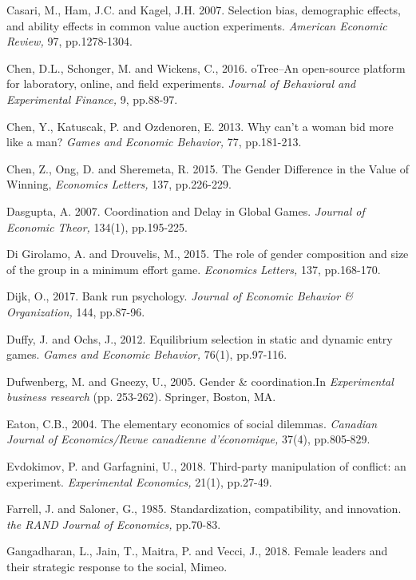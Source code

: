 \documentclass[12pt,english]{article}
\begin{document}
\begin{thebibliography}{10}
\bibitem{} Casari, M., Ham, J.C. and Kagel, J.H. 2007. Selection bias, demographic effects, and ability effects in common value auction experiments. \textit{American Economic Review,} 97, pp.1278-1304.

 Chen, D.L., Schonger, M. and Wickens, C., 2016. oTree--An open-source platform for laboratory, online, and field experiments. \textit{Journal of Behavioral and Experimental Finance,} 9, pp.88-97.

 Chen, Y., Katuscak, P. and Ozdenoren, E. 2013. Why can't a woman bid more like a man? \textit{Games and Economic Behavior,} 77, pp.181-213.

 Chen, Z., Ong, D. and Sheremeta, R. 2015. The Gender Difference in the Value of Winning, \textit{Economics Letters,} 137, pp.226-229.

Dasgupta, A. 2007. Coordination and Delay in Global Games. \textit{Journal of Economic Theor,} 134(1), pp.195-225.

 Di Girolamo, A. and Drouvelis, M., 2015. The role of gender composition and size of the group in a minimum effort game. \textit{Economics Letters,} 137, pp.168-170.

 Dijk, O., 2017. Bank run psychology. \textit{Journal of Economic Behavior \& Organization,} 144, pp.87-96.

\bibitem{} Duffy, J. and Ochs, J., 2012. Equilibrium selection in static and dynamic entry games. \textit{Games and Economic Behavior,} 76(1), pp.97-116.

\bibitem{} Dufwenberg, M. and Gneezy, U., 2005. Gender \& coordination.In \textit{Experimental business research} (pp. 253-262). Springer, Boston, MA.

\bibitem{}Eaton, C.B., 2004. The elementary economics of social dilemmas. \textit{Canadian Journal of Economics/Revue canadienne d'\'{e}conomique,} 37(4), pp.805-829.

  Evdokimov, P. and Garfagnini, U., 2018. Third-party manipulation of conflict: an experiment. \textit{Experimental Economics,} 21(1), pp.27-49.

  Farrell, J. and Saloner, G., 1985. Standardization, compatibility, and innovation. \textit{the RAND Journal of Economics,} pp.70-83.

 Gangadharan, L., Jain, T., Maitra, P. and Vecci, J., 2018. Female leaders and their strategic response to the social, Mimeo.


\end{thebibliography}
\end{document}
